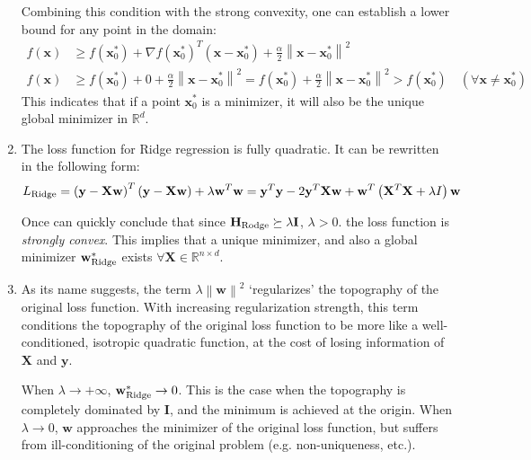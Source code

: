 \documentclass[a4paper, 10pt]{article}
\newcommand{\annot}[1]{{\rm #1}}
\begin{document}
\begin{enumerate}[label=(\alph*)]
    Combining this condition with the strong convexity, one can establish a lower bound for any point in the domain:
    \begin{equation}
        \begin{aligned}
            f(\mathbf{x}) &\geq f(\mathbf{x}^*_0) + \nabla f(\mathbf{x}^*_0)^T \left(\mathbf{x} - \mathbf{x}^*_0\right) + \frac{\alpha}{2} \left\| \mathbf{x} - \mathbf{x}^*_0 \right\|^2 \\ 
            f(\mathbf{x}) &\geq f(\mathbf{x}^*_0) + 0 + \frac{\alpha}{2} \left\| \mathbf{x} - \mathbf{x}^*_0 \right\|^2 = f(\mathbf{x}^*_0) + \frac{\alpha}{2} \left\| \mathbf{x} - \mathbf{x}^*_0 \right\|^2 > f(\mathbf{x}^*_0) \quad \left(\forall \mathbf{x} \neq \mathbf{x}^*_0\right)
        \end{aligned}
    \end{equation}
    This indicates that if a point $\mathbf{x}^*_0$ is a minimizer, it will also be the unique global minimizer in $\mathbb{R}^d$.
    
    \item The loss function for Ridge regression is fully quadratic. It can be rewritten in the following form:
    \begin{equation}
        L_{\annot{Ridge}} = \left(\mathbf{y} - \mathbf{X}\mathbf{w}\right)^T \left(\mathbf{y} - \mathbf{X}\mathbf{w}\right) + \lambda \mathbf{w}^T \mathbf{w} = \mathbf{y}^T \mathbf{y} - 2 \mathbf{y}^T \mathbf{X} \mathbf{w} + \mathbf{w}^T \left(\mathbf{X}^T \mathbf{X} + \lambda I\right) \mathbf{w}
    \end{equation}
    
    Once can quickly conclude that since $\mathbf{H}_{\annot{Rodge}} \succeq \lambda \mathbf{I}$, $\lambda >0$. the loss function is \textit{strongly convex}. This implies that a unique minimizer, and also a global minimizer $\mathbf{w}^*_{\annot{Ridge}}$ exists $\forall \mathbf{X} \in \mathbb{R}^{n\times d}$.
    
    \item As its name suggests, the term $\lambda \left\|\mathbf{w}\right\|^2$ `regularizes' the topography of the original loss function. With increasing regularization strength, this term conditions the topography of the original loss function to be more like a well-conditioned, isotropic quadratic function, at the cost of losing information of $\mathbf{X}$ and $\mathbf{y}$.
    
    When $\lambda \rightarrow +\infty$, $\mathbf{w}^*_{\annot{Ridge}} \rightarrow 0$. This is the case when the topography is completely dominated by $\mathbf{I}$, and the minimum is achieved at the origin. When $\lambda \rightarrow 0$, $\mathbf{w}$ approaches the minimizer of the original loss function, but suffers from ill-conditioning of the original problem (e.g. non-uniqueness, etc.).
\end{enumerate}
\end{document}
